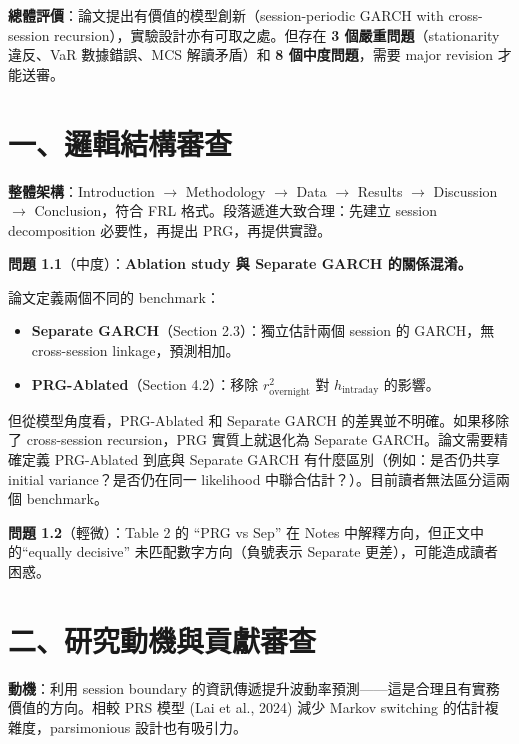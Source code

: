 \documentclass[12pt,a4paper]{article}
\begin{document}
\textbf{總體評價}：論文提出有價值的模型創新（session-periodic GARCH with cross-session recursion），實驗設計亦有可取之處。但存在 \textbf{3 個嚴重問題}（stationarity 違反、VaR 數據錯誤、MCS 解讀矛盾）和 \textbf{8 個中度問題}，需要 major revision 才能送審。


\section{一、邏輯結構審查}

\textbf{整體架構}：Introduction $\to$ Methodology $\to$ Data $\to$ Results $\to$ Discussion $\to$ Conclusion，符合 FRL 格式。段落遞進大致合理：先建立 session decomposition 必要性，再提出 PRG，再提供實證。

\textbf{問題 1.1}（\textcolor{warncolor}{中度}）：\textbf{Ablation study 與 Separate GARCH 的關係混淆。}

論文定義兩個不同的 benchmark：
\begin{itemize}
    \item \textbf{Separate GARCH}（Section 2.3）：獨立估計兩個 session 的 GARCH，無 cross-session linkage，預測相加。
    \item \textbf{PRG-Ablated}（Section 4.2）：移除 $r^2_\text{overnight}$ 對 $h_\text{intraday}$ 的影響。
\end{itemize}

但從模型角度看，PRG-Ablated 和 Separate GARCH 的差異並不明確。如果移除了 cross-session recursion，PRG 實質上就退化為 Separate GARCH。論文需要精確定義 PRG-Ablated 到底與 Separate GARCH 有什麼區別（例如：是否仍共享 initial variance？是否仍在同一 likelihood 中聯合估計？）。目前讀者無法區分這兩個 benchmark。

\textbf{問題 1.2}（輕微）：Table 2 的 ``PRG vs Sep'' 在 Notes 中解釋方向，但正文中的``equally decisive'' 未匹配數字方向（負號表示 Separate 更差），可能造成讀者困惑。


\section{二、研究動機與貢獻審查}

\textbf{動機}：利用 session boundary 的資訊傳遞提升波動率預測——這是合理且有實務價值的方向。相較 PRS 模型 (Lai et al., 2024) 減少 Markov switching 的估計複雜度，parsimonious 設計也有吸引力。
\end{document}
